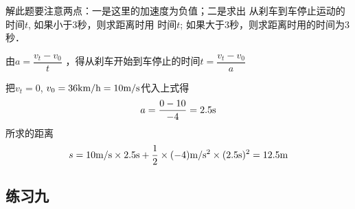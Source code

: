 \begin{enumerate}
\begin{solution}
    解此题要注意两点：一是这里的加速度为负值；二是求出
    从刹车到车停止运动的时间$t$, 如果小于3秒，则求距离时用
    时间$t$; 如果大于3秒，则求距离时用的时间为3秒．
   
    由$a=\dfrac{v_t-v_0}{t}$
    ，得从刹车开始到车停止的时间$t=\dfrac{v_t-v_0}{a}$
    
    把$v_t=0$, $v_0=36\text{km}/\text{h}=10\text{m}/\text{s}$代入上式得
\[a=\frac{0-10}{-4}=2.5{\rm s}\]
    所求的距离
    \[s=10\text{m}/\text{s}\times2.5{\rm s}+\frac{1}{2}\times (-4)\text{m}/\text{s}^2\times (2.5{\rm s})^2=12.5{\rm m}\]
\end{solution}

\end{enumerate}




\subsection{练习九}
